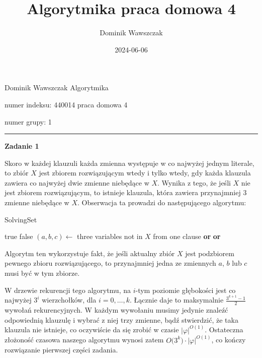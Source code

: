 \documentclass[12pt]{article}
\title{Algorytmika praca domowa 4}
\author{Dominik Wawszczak}
\date{2024-06-06}
\begin{document}
	\setlength{\parindent}{0 cm}
	
	Dominik Wawszczak \hfill Algorytmika
	
	numer indeksu: 440014 \hfill praca domowa 4
	
	numer grupy: 1
	
	\bigskip
	\hrule
	\bigskip
	
	\textbf{Zadanie 1}
	
	\medskip
	
	Skoro w każdej klauzuli każda zmienna występuje w co najwyżej jednym
	literale, to zbiór \(X\) jest zbiorem rozwiązującym wtedy i tylko wtedy, gdy
	każda klauzula zawiera co najwyżej dwie zmienne niebędące w \(X\). Wynika z
	tego, że jeśli \(X\) nie jest zbiorem rozwiązującym, to istnieje klauzula,
	która zawiera przynajmniej \(3\) zmienne niebędące w \(X\). Obserwacja ta
	prowadzi do następującego algorytmu:
	
	\begin{algorithm}
		\caption{SolvingSet}
		\begin{algorithmic}[1]
			        \State \Return true
			    \EndIf
			        \State \Return false
			    \EndIf
			    \State $(a, b, c) \gets$ three variables not in $X$ from one
			    clause
			    \State \Return {}
			    \textbf{or}  \textbf{or}
			    \Statex \hspace{4.685em} 
		\EndProcedure
		\end{algorithmic}
	\end{algorithm}
	
	Algorytm ten wykorzystuje fakt, że jeśli aktualny zbiór \(X\) jest
	podzbiorem pewnego zbioru rozwiązującego, to przynajmniej jedna ze zmiennych
	\(a\), \(b\) lub \(c\) musi być w tym zbiorze.
	
	\medskip
	
	W drzewie rekurencji tego algorytmu, na \(i\)-tym poziomie głębokości jest
	co najwyżej \(3^{i}\) wierzchołków, dla \(i = 0, \ldots, k\). Łącznie daje
	to maksymalnie \(\frac{3^{k + 1} - 1}{2}\) wywołań rekurencyjnych. W każdym
	wywołaniu musimy jedynie znaleźć odpowiednią klauzulę i wybrać z niej trzy
	zmienne, bądź stwierdzić, że taka klauzula nie istnieje, co oczywiście da
	się zrobić w czasie \(|\varphi|^{O(1)}\). Ostateczna złożoność czasowa
	naszego algorytmu wynosi zatem \(O\big(3^{k}\big) \cdot |\varphi|^{O(1)}\),
	co kończy rozwiązanie pierwszej części zadania.
	
\end{document}
